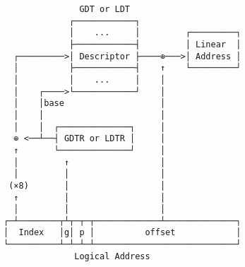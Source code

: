 \documentclass[varwidth=35em]{standalone}
\begin{document}
\begin{verbatim}
               GDT or LDT
             ┌────────────┐
             │    ...     │         ┌─────────┐
             ├────────────┤         │ Linear  │
  ┌─────────>│ Descriptor ├────⊕───>│ Address │
  │          ├────────────┤    ↑    └─────────┘
  │          │    ...     │    │
  │    ┌────>└────────────┘    │
  │    │base                   │
  │    │                       │
  │    │  ┌──────────────┐     │
  ⊕ <──┴──┤ GDTR or LDTR │     │
  ↑       └──────────────┘     │
  │         ↑                  │
  │         │                  │
 (×8)       │                  │
  ↑         │                  │
  │         │                  │
┌─┴────────┬┴┬─┬─┬─────────────┴──────────────┐
│  Index   │g│ p │          offset            │
└──────────┴─┴─┴─┴────────────────────────────┘
              Logical Address
\end{verbatim}
\end{document}
